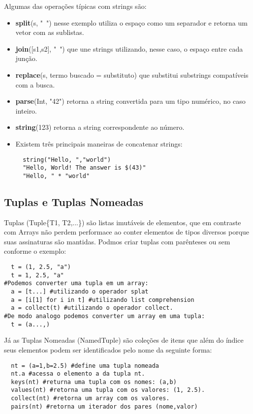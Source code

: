 Algumas das operações típicas com strings são:
\begin{itemize}
    \item \textbf{split}(s, "\ ") nesse exemplo utiliza o espaço como um separador e retorna um vetor com as sublistas.
    \item \textbf{join}([s1,s2], "\ ") que une strings utilizando, nesse caso, o espaço entre cada junção.
    \item \textbf{replace}(s, {termo buscado} =  {substituto}) que substitui substrings compatíveis com a busca.
    \item \textbf{parse}(Int, "42") retorna a string convertida para um tipo numérico, no caso inteiro.
    \item \textbf{string}(123) retorna a string correspondente ao número.
    \item Existem três principais maneiras de concatenar strings:
        \subitem 
        \begin{lstlisting}    
  string("Hello, ","world")
  "Hello, World! The answer is $(43)"
  "Hello, " * "world"
        \end{lstlisting}
        
\end{itemize}


\subsection{Tuplas e Tuplas Nomeadas}
Tuplas (Tuple\{T1, T2,...\}) são listas imutáveis de elementos, que em contraste com Arrays não perdem performace ao conter elementos de tipos diversos porque suas assinaturas são mantidas. Podmos criar tuplas com parênteses ou sem conforme o exemplo:
\begin{lstlisting}
  t = (1, 2.5, "a")
  t = 1, 2.5, "a"
#Podemos converter uma tupla em um array:
  a = [t...] #utilizando o operador splat
  a = [i[1] for i in t] #utilizando list comprehension
  a = collect(t) #utilizando o operador collect. 
#De modo analogo podemos converter um array em uma tupla:
  t = (a...,)
\end{lstlisting}  
Já as Tuplas Nomeadas (NamedTuple) são coleções de itens que além do índice seus elementos podem ser identificados pelo nome da seguinte forma: 
\begin{lstlisting}
  nt = (a=1,b=2.5) #define uma tupla nomeada
  nt.a #acessa o elemento a da tupla nt.
  keys(nt) #returna uma tupla com os nomes: (a,b)
  values(nt) #retorna uma tupla com os valores: (1, 2.5).
  collect(nt) #retorna um array com os valores.
  pairs(nt) #retorna um iterador dos pares (nome,valor) 
\end{lstlisting}

